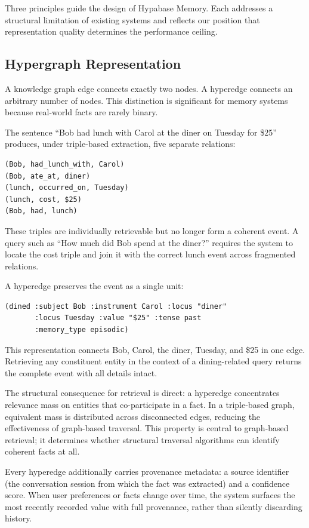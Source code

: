 \documentclass[11pt,a4paper]{article}
\begin{document}
Three principles guide the design of Hypabase Memory. Each addresses a structural limitation of existing systems and reflects our position that representation quality determines the performance ceiling.

\subsection{Hypergraph Representation}

A knowledge graph edge connects exactly two nodes. A hyperedge connects an arbitrary number of nodes. This distinction is significant for memory systems because real-world facts are rarely binary.

The sentence ``Bob had lunch with Carol at the diner on Tuesday for \$25'' produces, under triple-based extraction, five separate relations:

\begin{lstlisting}
(Bob, had_lunch_with, Carol)
(Bob, ate_at, diner)
(lunch, occurred_on, Tuesday)
(lunch, cost, $25)
(Bob, had, lunch)
\end{lstlisting}

These triples are individually retrievable but no longer form a coherent event. A query such as ``How much did Bob spend at the diner?'' requires the system to locate the cost triple and join it with the correct lunch event across fragmented relations.

A hyperedge preserves the event as a single unit:

\begin{lstlisting}
(dined :subject Bob :instrument Carol :locus "diner"
       :locus Tuesday :value "$25" :tense past
       :memory_type episodic)
\end{lstlisting}

This representation connects Bob, Carol, the diner, Tuesday, and \$25 in one edge. Retrieving any constituent entity in the context of a dining-related query returns the complete event with all details intact.

The structural consequence for retrieval is direct: a hyperedge concentrates relevance mass on entities that co-participate in a fact. In a triple-based graph, equivalent mass is distributed across disconnected edges, reducing the effectiveness of graph-based traversal. This property is central to graph-based retrieval; it determines whether structural traversal algorithms can identify coherent facts at all.

Every hyperedge additionally carries provenance metadata: a source identifier (the conversation session from which the fact was extracted) and a confidence score. When user preferences or facts change over time, the system surfaces the most recently recorded value with full provenance, rather than silently discarding history.
\end{document}
